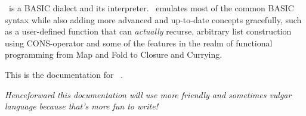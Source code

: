 \tbas\ is a BASIC dialect and its interpreter. \tbas\ emulates most of the common BASIC syntax while also adding more advanced and up-to-date concepts gracefully, such as a user-defined function that can \emph{actually} recurse, arbitrary list construction using CONS-operator and some of the features in the realm of functional programming from Map and Fold to Closure and Currying.

This is the documentation for \tbas\ \tbasver.

\vfill

\small\emph{Henceforward this documentation will use more friendly and sometimes vulgar language because that's more fun to write!}
